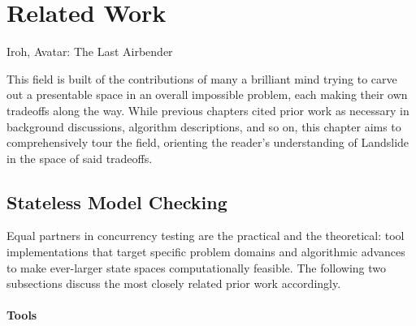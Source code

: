 \chapter{Related Work}
\label{chap:relatedwork}

{Iroh, Avatar: The Last Airbender}

This field is built of the contributions of many a brilliant mind
trying to carve out a presentable space in an overall impossible problem,
each making their own tradeoffs along the way.
While previous chapters cited prior work as necessary in background discussions, algorithm descriptions, and so on,
this chapter aims to comprehensively tour the field,
orienting the reader's understanding of Landslide in the space of said tradeoffs.

\section{Stateless Model Checking}

Equal partners in concurrency testing are the practical and the theoretical:
tool implementations that target specific problem domains
and algorithmic advances to make ever-larger state spaces computationally feasible.
The following two subsections discuss the most closely related prior work accordingly.

\subsubsection{Tools}


